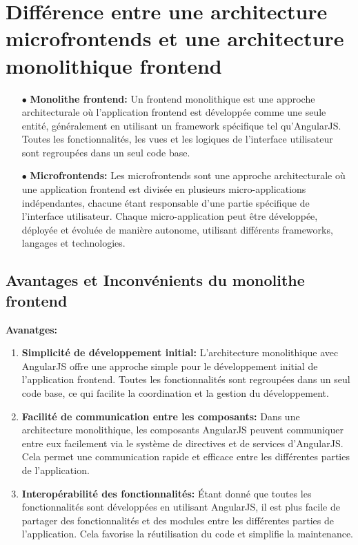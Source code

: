\section{Différence entre une architecture microfrontends et une architecture monolithique frontend}
\begin{enumerate}
    \item[$\bullet$] \textbf{Monolithe frontend:} Un frontend monolithique est une approche architecturale où l'application frontend est développée comme une seule entité, généralement en utilisant un framework spécifique tel qu'AngularJS. Toutes les fonctionnalités, les vues et les logiques de l'interface utilisateur sont regroupées dans un seul code base.
    \item[$\bullet$] \textbf{Microfrontends:} Les microfrontends sont une approche architecturale où une application frontend est divisée en plusieurs micro-applications indépendantes, chacune étant responsable d'une partie spécifique de l'interface utilisateur. Chaque micro-application peut être développée, déployée et évoluée de manière autonome, utilisant différents frameworks, langages et technologies.
\end{enumerate}

\subsection{Avantages et Inconvénients du monolithe frontend}
\textbf{Avanatges:}
\begin{enumerate}
    \item \textbf{Simplicité de développement initial:} L'architecture monolithique avec AngularJS offre une approche simple pour le développement initial de l'application frontend. Toutes les fonctionnalités sont regroupées dans un seul code base, ce qui facilite la coordination et la gestion du développement.
    \item \textbf{Facilité de communication entre les composants:} Dans une architecture monolithique, les composants AngularJS peuvent communiquer entre eux facilement via le système de directives et de services d'AngularJS. Cela permet une communication rapide et efficace entre les différentes parties de l'application. 
    \item \textbf{Interopérabilité des fonctionnalités:} Étant donné que toutes les fonctionnalités sont développées en utilisant AngularJS, il est plus facile de partager des fonctionnalités et des modules entre les différentes parties de l'application. Cela favorise la réutilisation du code et simplifie la maintenance.
\end{enumerate}

